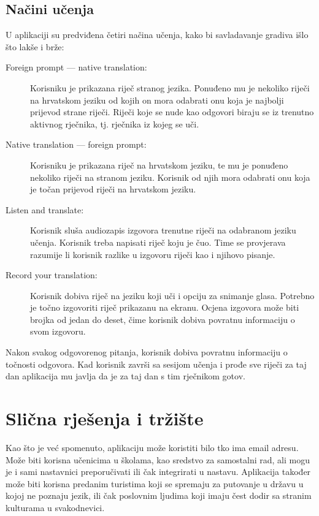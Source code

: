 \subsection{Načini učenja} 

U aplikaciji su predviđena četiri načina učenja, kako bi savladavanje gradiva išlo što lakše i brže:
\begin{description}
	\item[Foreign prompt --- native translation:] Korisniku je prikazana riječ stranog jezika. Ponuđeno mu je nekoliko riječi na hrvatskom jeziku od 
	kojih on mora odabrati onu koja je najbolji prijevod strane riječi. Riječi koje se nude kao odgovori biraju se iz trenutno aktivnog rječnika, tj. rječnika iz kojeg se uči. 

	\item[Native translation --- foreign prompt:] Korisniku je prikazana riječ na hrvatskom jeziku, te mu je ponuđeno nekoliko riječi na stranom jeziku. 
	Korisnik od njih mora odabrati onu koja je točan prijevod riječi na hrvatskom jeziku.

	\item[Listen and translate:] Korisnik sluša audiozapis izgovora trenutne riječi na odabranom jeziku učenja. Korisnik treba napisati 
	riječ koju je čuo. Time se provjerava razumije li korisnik razlike u izgovoru riječi kao i njihovo pisanje.

	\item[Record your translation:] Korisnik dobiva riječ na jeziku koji uči i opciju za snimanje glasa. Potrebno je točno 
	izgovoriti riječ prikazanu na ekranu. Ocjena izgovora može biti brojka od jedan do deset, čime korisnik dobiva povratnu informaciju o svom izgovoru.
\end{description}

Nakon svakog odgovorenog pitanja, korisnik dobiva povratnu informaciju o točnosti odgovora. Kad korisnik završi sa 
sesijom učenja i prođe sve riječi za taj dan aplikacija mu javlja da je za taj dan s tim rječnikom gotov. 

\eject

\section{Slična rješenja i tržište}

Kao što je već spomenuto, aplikaciju može koristiti bilo tko ima email adresu. Može biti korisna učenicima u školama, 
kao sredstvo za samostalni rad, ali mogu je i sami nastavnici preporučivati ili čak integrirati u nastavu. Aplikacija također može biti 
korisna predanim turistima koji se spremaju za putovanje u državu u kojoj ne poznaju jezik, ili čak poslovnim ljudima koji imaju čest dodir 
sa stranim kulturama u svakodnevici. 

